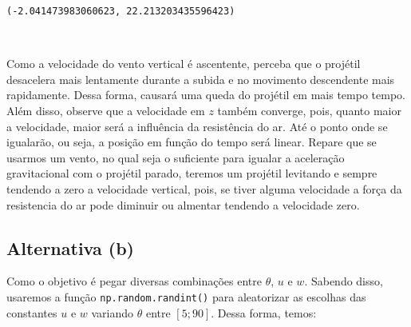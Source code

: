 \documentclass[12pt, a4paper]{article}
\makeatletter
\newcommand{\boxspacing}{\kern\kvtcb@left@rule\kern\kvtcb@boxsep}
\newcommand{\prompt}[4]{
        {\ttfamily\llap{{\color{#2}[#3]:\hspace{3pt}#4}}\vspace{-\baselineskip}}
    }
\makeatother
\begin{document}
            \begin{tcolorbox}[breakable, size=fbox, boxrule=.5pt, pad at break*=1mm, opacityfill=0]
\prompt{Out}{outcolor}{18}{\boxspacing}
\begin{Verbatim}[commandchars=\\\{\}]
(-2.041473983060623, 22.213203435596423)
\end{Verbatim}
\end{tcolorbox}
        
    \begin{center}
    \end{center}
    { \hspace*{\fill} \\}
    
    Como a velocidade do vento vertical é ascentente, perceba que o projétil
desacelera mais lentamente durante a subida e no movimento descendente
mais rapidamente. Dessa forma, causará uma queda do projétil em mais
tempo tempo. Além disso, observe que a velocidade em \(z\) também
converge, pois, quanto maior a velocidade, maior será a influência da
resistência do ar. Até o ponto onde se igualarão, ou seja, a posição em
função do tempo será linear. Repare que se usarmos um vento, no qual
seja o suficiente para igualar a aceleração gravitacional com o projétil
parado, teremos um projétil levitando e sempre tendendo a zero a
velocidade vertical, pois, se tiver alguma velocidade a força da
resistencia do ar pode diminuir ou almentar tendendo a velocidade zero.

\hypertarget{alternativa-b}{%
\subsection{Alternativa (b)}\label{alternativa-b}}

Como o objetivo é pegar diversas combinações entre \(\theta\), \(u\) e
\(w\). Sabendo disso, usaremos a função \texttt{np.random.randint()}
para aleatorizar as escolhas das constantes \(u\) e \(w\) variando
\(\theta\) entre \([5; 90]\). Dessa forma, temos:
\end{document}
